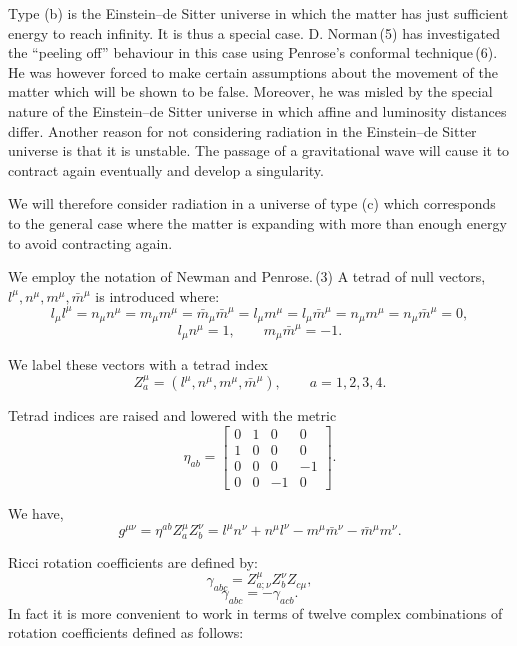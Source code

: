 Type (b) is the Einstein–de Sitter universe in which the 
matter has just sufficient energy to reach infinity. It is 
thus a special case. D. Norman\,(5) has investigated the 
``peeling off'' behaviour in this case using Penrose’s conformal 
technique\,(6). He was however forced to make certain assumptions 
about the movement of the matter which will be shown to 
be false. Moreover, he was misled by the special nature of 
the Einstein–de Sitter universe in which affine and luminosity 
distances differ. Another reason for not considering radiation 
in the Einstein–de Sitter universe is that it is unstable.  
The passage of a gravitational wave will cause it to contract 
again eventually and develop a singularity.  

We will therefore consider radiation in a universe of 
type (c) which corresponds to the general case where the 
matter is expanding with more than enough energy to avoid 
contracting again.  


We employ the notation of Newman and Penrose.\,(3) A 
tetrad of null vectors, $l^{\mu}, n^{\mu}, m^{\mu}, \bar{m}^{\mu}$ is introduced
where:
\[
l_{\mu}l^{\mu} = n_{\mu}n^{\mu} = m_{\mu}m^{\mu} = \bar{m}_{\mu}\bar{m}^{\mu} =
l_{\mu}m^{\mu} = l_{\mu}\bar{m}^{\mu} = n_{\mu}m^{\mu} = n_{\mu}\bar{m}^{\mu} = 0,
\]
\[
l_{\mu}n^{\mu} = 1, \qquad m_{\mu}\bar{m}^{\mu} = -1.
\]

We label these vectors with a tetrad index
\[
Z^{\mu}_{a} = (l^{\mu}, n^{\mu}, m^{\mu}, \bar{m}^{\mu}), \qquad a = 1,2,3,4.
\]

Tetrad indices are raised and lowered with the metric
\[
\eta_{ab} =
\begin{bmatrix}
0 & 1 & 0 & 0 \\
1 & 0 & 0 & 0 \\
0 & 0 & 0 & -1 \\
0 & 0 & -1 & 0
\end{bmatrix}. \tag{2.1}
\]

We have,
\[
g^{\mu\nu} = \eta^{ab} Z^{\mu}_{a} Z^{\nu}_{b}
= l^{\mu}n^{\nu} + n^{\mu}l^{\nu} - m^{\mu}\bar{m}^{\nu} - \bar{m}^{\mu}m^{\nu}. \tag{2.2}
\]

Ricci rotation coefficients are defined by:
\[
\gamma_{abc} = Z^{\mu}_{a;\nu} Z^{\nu}_{b} Z_{c\mu}, \tag{2.3}
\]
\[
\gamma_{abc} = -\gamma_{acb}.
\]
In fact it is more convenient to work in terms of twelve 
complex combinations of rotation coefficients defined as follows:

